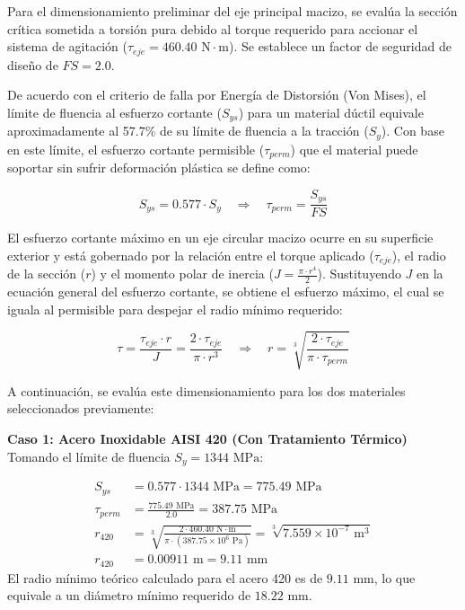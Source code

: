 \documentclass[12pt, a4paper]{article}
\begin{document}
Para el dimensionamiento preliminar del eje principal macizo, se evalúa la sección crítica sometida a torsión pura debido al torque requerido para accionar el sistema de agitación ($\tau_{eje} = 460.40 \text{ N}\cdot\text{m}$). Se establece un factor de seguridad de diseño de $FS = 2.0$.

De acuerdo con el criterio de falla por Energía de Distorsión (Von Mises), el límite de fluencia al esfuerzo cortante ($S_{ys}$) para un material dúctil equivale aproximadamente al 57.7\% de su límite de fluencia a la tracción ($S_y$). Con base en este límite, el esfuerzo cortante permisible ($\tau_{perm}$) que el material puede soportar sin sufrir deformación plástica se define como:

\begin{equation}
    S_{ys} = 0.577 \cdot S_y \quad \Rightarrow \quad \tau_{perm} = \frac{S_{ys}}{FS}
\end{equation}

El esfuerzo cortante máximo en un eje circular macizo ocurre en su superficie exterior y está gobernado por la relación entre el torque aplicado ($\tau_{eje}$), el radio de la sección ($r$) y el momento polar de inercia ($J = \frac{\pi \cdot r^4}{2}$). Sustituyendo $J$ en la ecuación general del esfuerzo cortante, se obtiene el esfuerzo máximo, el cual se iguala al permisible para despejar el radio mínimo requerido:

\begin{equation}
    \tau = \frac{\tau_{eje} \cdot r}{J} = \frac{2 \cdot \tau_{eje}}{\pi \cdot r^3} \quad \Rightarrow \quad r = \sqrt[3]{\frac{2 \cdot \tau_{eje}}{\pi \cdot \tau_{perm}}}
\end{equation}

A continuación, se evalúa este dimensionamiento para los dos materiales seleccionados previamente:

\textbf{Caso 1: Acero Inoxidable AISI 420 (Con Tratamiento Térmico)} \\
Tomando el límite de fluencia $S_y = 1344 \text{ MPa}$:

\begin{align}
    S_{ys} &= 0.577 \cdot 1344 \text{ MPa} = 775.49 \text{ MPa} \\[6pt]
    \tau_{perm} &= \frac{775.49 \text{ MPa}}{2.0} = 387.75 \text{ MPa} \\[6pt]
    r_{420} &= \sqrt[3]{\frac{2 \cdot 460.40 \text{ N}\cdot\text{m}}{\pi \cdot (387.75 \times 10^6 \text{ Pa})}} = \sqrt[3]{7.559 \times 10^{-7} \text{ m}^3} \\[6pt]
    r_{420} &= 0.00911 \text{ m} = 9.11 \text{ mm}
\end{align}
El radio mínimo teórico calculado para el acero 420 es de $9.11 \text{ mm}$, lo que equivale a un diámetro mínimo requerido de $18.22 \text{ mm}$.
\end{document}
